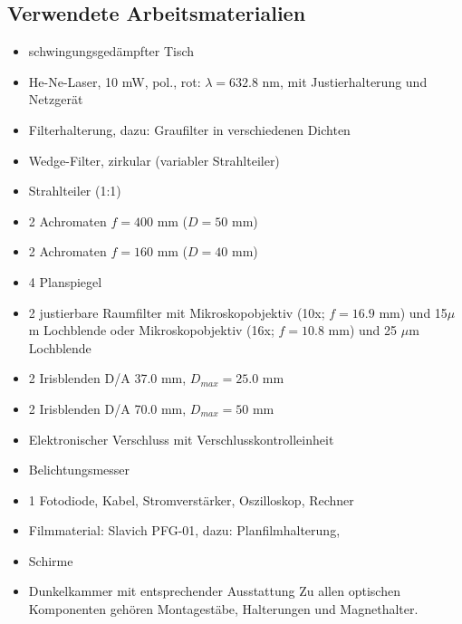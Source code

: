\subsection{Verwendete Arbeitsmaterialien}
\begin{itemize}
\item schwingungsgedämpfter Tisch 
\item He-Ne-Laser, 10 mW, pol., rot: $\lambda = 632.8$ nm, mit Justierhalterung und Netzgerät 
\item Filterhalterung, dazu: Graufilter in verschiedenen Dichten 
\item Wedge-Filter, zirkular (variabler Strahlteiler) 
\item Strahlteiler (1:1) 
\item 2 Achromaten $f = 400$ mm ($D = 50$ mm) 
\item 2 Achromaten $f = 160$ mm ($D = 40$ mm) 
\item 4 Planspiegel 
\item 2 justierbare Raumfilter mit Mikroskopobjektiv (10x; $f = 16.9$ mm) und 15$\mu$m Lochblende oder Mikroskopobjektiv (16x; $f = 10.8$ mm) und 25 $\mu$m Lochblende 
\item 2 Irisblenden D/A 37.0 mm, $D_{max} = 25.0$ mm 
\item 2 Irisblenden D/A 70.0 mm, $D_{max} = 50$ mm 
\item Elektronischer Verschluss mit Verschlusskontrolleinheit 
\item Belichtungsmesser 
\item 1 Fotodiode, Kabel, Stromverstärker, Oszilloskop, Rechner 
\item Filmmaterial: Slavich PFG-01, dazu: Planfilmhalterung, 
\item Schirme 
\item Dunkelkammer mit entsprechender Ausstattung 
Zu allen optischen Komponenten gehören Montagestäbe, Halterungen und Magnethalter. 
\end{itemize}
